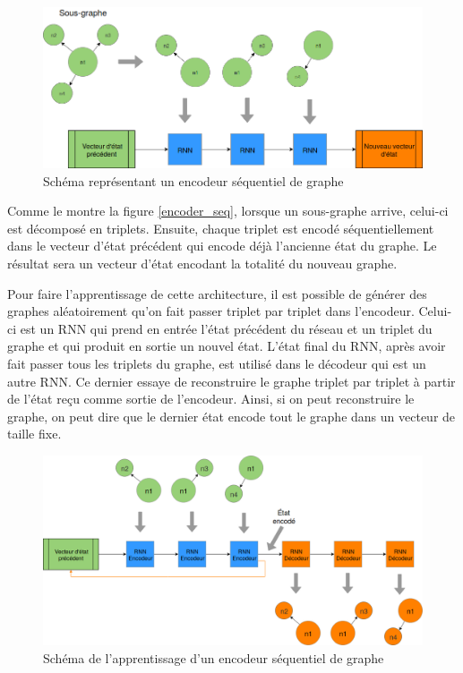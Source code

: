 \begin{figure}[H] 
	\centering
	\includegraphics[width=0.8\linewidth]{images/Conception/DM/encoder_seq.png}
	\caption{Schéma représentant un encodeur séquentiel de graphe}
	
\end{figure}\label{encoder_seq}
Comme le montre la figure \ref{encoder_seq}, lorsque un sous-graphe arrive, celui-ci est décomposé en triplets. Ensuite, chaque triplet est encodé séquentiellement dans le vecteur d'état précédent qui encode déjà l'ancienne état du graphe. Le résultat sera un vecteur d'état encodant la totalité du nouveau graphe.
\par Pour faire l'apprentissage de cette architecture, il est possible de générer des graphes aléatoirement qu'on fait passer triplet par triplet dans l'encodeur. Celui-ci est un RNN qui prend en entrée l'état précédent du réseau et un triplet du graphe et qui produit en sortie un nouvel état. L'état final du RNN, après avoir fait passer tous les triplets du graphe, est utilisé dans le décodeur qui est un autre RNN. Ce dernier essaye de reconstruire le graphe triplet par triplet à partir de l'état reçu comme sortie de l'encodeur. Ainsi, si on peut reconstruire le graphe, on peut dire que le dernier état encode tout le graphe dans un vecteur de taille fixe.
\begin{figure}[H] 
	\centering
	\includegraphics[width=0.9\linewidth]{images/Conception/DM/encoder_seq_train.png}
	\caption{Schéma de l'apprentissage d'un encodeur séquentiel de graphe}
	
\end{figure}\label{encoder_seq_train}
